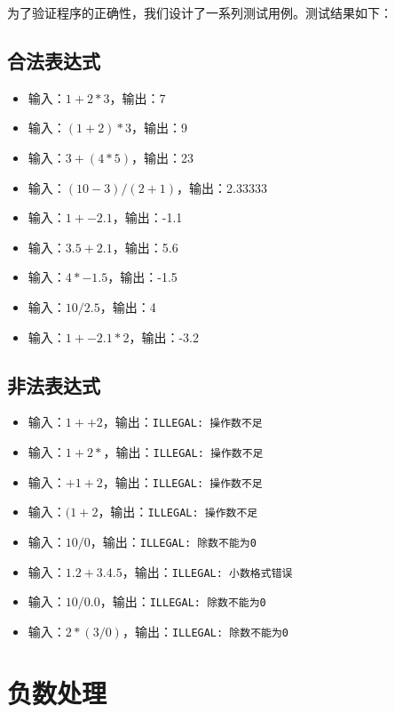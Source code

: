 \documentclass[UTF8]{ctexart}
\begin{document}
为了验证程序的正确性，我们设计了一系列测试用例。测试结果如下：

\subsection{合法表达式}

\begin{itemize}
    \item 输入：$1 + 2 * 3$，输出：7
    \item 输入：$(1 + 2) * 3$，输出：9
    \item 输入：$3 + (4 * 5)$，输出：23
    \item 输入：$(10 - 3) / (2 + 1)$，输出：2.33333
    \item 输入：$1 + -2.1$，输出：-1.1
    \item 输入：$3.5 + 2.1$，输出：5.6
    \item 输入：$4 * -1.5$，输出：-1.5
    \item 输入：$10 / 2.5$，输出：4
    \item 输入：$1 + -2.1 * 2$，输出：-3.2
\end{itemize}

\subsection{非法表达式}

\begin{itemize}
    \item 输入：$1 ++ 2$，输出：\texttt{ILLEGAL: 操作数不足}
    \item 输入：$1 + 2 *$，输出：\texttt{ILLEGAL: 操作数不足}
    \item 输入：$+ 1 + 2$，输出：\texttt{ILLEGAL: 操作数不足}
    \item 输入：$(1 + 2$，输出：\texttt{ILLEGAL: 操作数不足}
    \item 输入：$10 / 0$，输出：\texttt{ILLEGAL: 除数不能为0}
    \item 输入：$1.2 + 3.4.5$，输出：\texttt{ILLEGAL: 小数格式错误}
    \item 输入：$10 / 0.0$，输出：\texttt{ILLEGAL: 除数不能为0}
    \item 输入：$2 * (3 / 0)$，输出：\texttt{ILLEGAL: 除数不能为0}
\end{itemize}

\section{负数处理}
\end{document}
